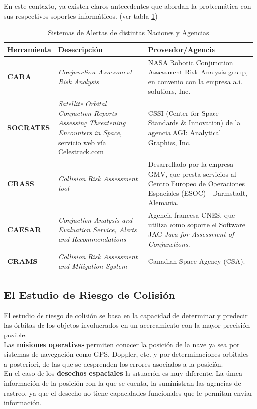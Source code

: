 En este contexto, ya existen claros antecedentes que abordan la problem\'atica con sus respectivos soportes inform\'aticos. (ver tabla \ref{tab:sisal})
\begin{table}[!h]
\centering
\begin{tabular}{|l|p{5cm}|p{6cm}|}
\hline
Herramienta & Desecripci\'on & Proveedor/Agencia\\
\hline
{\bf{CARA}} & {\it{Conjunction Assessment Risk Analysis}} & NASA Robotic Conjunction Assessment Risk Analysis group, en convenio con la empresa a.i. solutions, Inc.\\
\hline
{\bf{SOCRATES}} & {\it{Satellite Orbital Conjuction Reports Assessing Threatening Encounters in Space}}, servicio web v\'ia Celestrack.com & CSSI (Center for Space Standards \& Innovation) de la agencia AGI: Analytical Graphics, Inc.\\
\hline
{\bf{CRASS}} & {\it{Collision Risk Assessment tool}} & Desarrollado por la
empresa GMV, que presta servicios al Centro Europeo de Operaciones
Espaciales (ESOC) - Darmstadt, Alemania. \cite{alarconRodriguez}\\
\hline
{\bf{CAESAR}} & {\it{Conjuction Analysis and Evaluation Service, Alerts and Recommendations}} & Agencia francesa CNES, que utiliza como soporte el Software JAC {\it{Java for Assessment of Conjunctions}}.\cite{laporte}\\
\hline
{\bf{CRAMS}} & {\it{Collision Risk Assessment and Mitigation System}} & Canadian Space Agency (CSA). \cite{babiker}\\
\hline
\end{tabular}
\caption[Sistemas de Alerta]{Sistemas de Alertas de distintas Naciones y Agencias}
\label{tab:sisal}
\end{table}

\subsection*{El Estudio de Riesgo de Colisi\'on}
El estudio de riesgo de colisi\'on se basa en la capacidad de determinar y predecir las \'orbitas de los objetos involucrados en un acercamiento con la mayor precisi\'on posible.\\
Las {\bf{misiones operativas}} permiten conocer la posici\'on de la nave ya sea por sistemas de navegaci\'on como GPS, Doppler, etc. y por determinaciones orbitales a posteriori, de las que se desprenden los errores asociados a la posici\'on.\\
En el caso de los {\bf{desechos espaciales}} la situaci\'on es muy diferente. La \'unica informaci\'on de la posici\'on con la que se cuenta, la suministran las agencias de rastreo, ya que el desecho no tiene capacidades funcionales que le permitan enviar informaci\'on.\\

